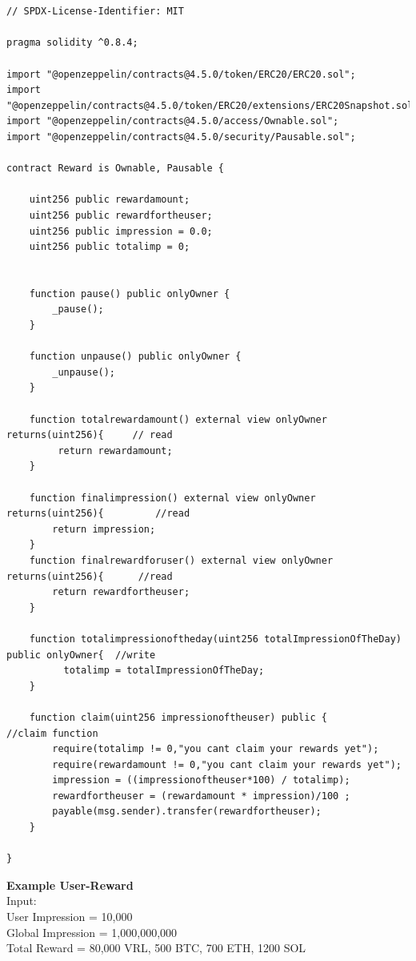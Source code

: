 \documentclass[10pt]{article}
\begin{document}
\begin{lstlisting}[language=Solidity, caption={User Reward Contract}, numbers=none]


// SPDX-License-Identifier: MIT

pragma solidity ^0.8.4;

import "@openzeppelin/contracts@4.5.0/token/ERC20/ERC20.sol";
import "@openzeppelin/contracts@4.5.0/token/ERC20/extensions/ERC20Snapshot.sol";
import "@openzeppelin/contracts@4.5.0/access/Ownable.sol";
import "@openzeppelin/contracts@4.5.0/security/Pausable.sol";

contract Reward is Ownable, Pausable {
   
    uint256 public rewardamount;
    uint256 public rewardfortheuser;
    uint256 public impression = 0.0;
    uint256 public totalimp = 0;


    function pause() public onlyOwner {
        _pause();
    }

    function unpause() public onlyOwner {
        _unpause();
    }
    
    function totalrewardamount() external view onlyOwner returns(uint256){     // read 
         return rewardamount;
    }

    function finalimpression() external view onlyOwner returns(uint256){         //read
        return impression;
    }
    function finalrewardforuser() external view onlyOwner returns(uint256){      //read
        return rewardfortheuser;
    }

    function totalimpressionoftheday(uint256 totalImpressionOfTheDay) public onlyOwner{  //write
          totalimp = totalImpressionOfTheDay;
    }
    
    function claim(uint256 impressionoftheuser) public {                         //claim function
        require(totalimp != 0,"you cant claim your rewards yet");
        require(rewardamount != 0,"you cant claim your rewards yet");
        impression = ((impressionoftheuser*100) / totalimp);
        rewardfortheuser = (rewardamount * impression)/100 ;
        payable(msg.sender).transfer(rewardfortheuser);
    }

}
\end{lstlisting}


\textbf{Example User-Reward}\\

Input:\\
User Impression = 10,000\\
Global Impression = 1,000,000,000\\
Total Reward = 80,000 VRL, 500 BTC, 700 ETH, 1200 SOL \\
\end{document}
